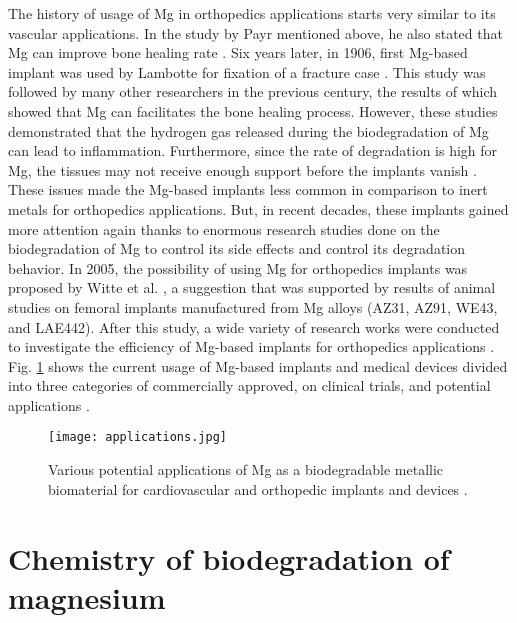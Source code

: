 The history of usage of Mg in orthopedics applications starts very similar to its vascular applications. In the study by Payr mentioned above, he also stated that Mg can improve bone healing rate \cite{Witte2010}. Six years later, in 1906, first Mg-based implant was used by Lambotte for fixation of a fracture case \cite{lambotte1909technique,lambotte1932utilisation}. This study was followed by many other researchers in the previous century, the results of which showed that Mg can facilitates the bone healing process. However, these studies demonstrated that the hydrogen gas released during the biodegradation of Mg can lead to inflammation. Furthermore, since the rate of degradation is high for Mg, the tissues may not receive enough support before the implants vanish \cite{Witte2010}. These issues made the Mg-based implants less common in comparison to inert metals for orthopedics applications. But, in recent decades, these implants gained more attention again thanks to enormous research studies done on the biodegradation of Mg to control its side effects and control its degradation behavior. In 2005, the possibility of using Mg for orthopedics implants was proposed by Witte et al. \cite{Witte2005}, a suggestion that was supported by results of animal studies on femoral implants manufactured from Mg alloys (AZ31, AZ91, WE43, and LAE442). After this study, a wide variety of research works were conducted to investigate the efficiency of Mg-based implants for orthopedics applications \cite{Wang2020,Huang2020,Zhao2017}. Fig. \ref{fig:intro_applications} shows the current usage of Mg-based implants and medical devices divided into three categories of commercially approved, on clinical trials, and potential applications \cite{Han2019}.

\begin{figure}
\centering
\medskip
\texttt{[image: applications.jpg]}
\caption[Various potential applications of Mg as a biodegradable biomaterial]{Various potential applications of Mg as a biodegradable metallic biomaterial for cardiovascular and orthopedic implants and devices \cite{Han2019}.} 
\label{fig:intro_applications}
\end{figure}


\section{Chemistry of biodegradation of magnesium}


